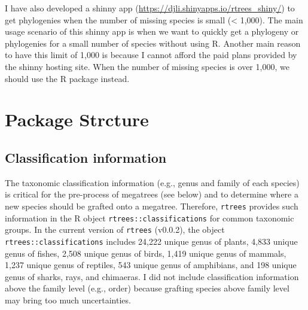 \documentclass[
  12pt,
]{article}
\begin{document}
I have also developed a shinny app (\url{https://djli.shinyapps.io/rtrees_shiny/}) to get phylogenies when the number of missing species is small (\textless{} 1,000). The main usage scenario of this shinny app is when we want to quickly get a phylogeny or phylogenies for a small number of species without using R. Another main reason to have this limit of 1,000 is because I cannot afford the paid plans provided by the shinny hosting site. When the number of missing species is over 1,000, we should use the R package instead.

\hypertarget{package-strcture}{%
\section{Package Strcture}\label{package-strcture}}

\hypertarget{classification-information}{%
\subsection{Classification information}\label{classification-information}}

The taxonomic classification information (e.g., genus and family of each species) is critical for the pre-process of megatrees (see below) and to determine where a new species should be grafted onto a megatree. Therefore, \texttt{rtrees} provides such information in the R object \texttt{rtrees::classifications} for common taxonomic groups. In the current version of \texttt{rtrees} (v0.0.2), the object \texttt{rtrees::classifications} includes 24,222 unique genus of plants, 4,833 unique genus of fishes, 2,508 unique genus of birds, 1,419 unique genus of mammals, 1,237 unique genus of reptiles, 543 unique genus of amphibians, and 198 unique genus of sharks, rays, and chimaeras. I did not include classification information above the family level (e.g., order) because grafting species above family level may bring too much uncertainties.
\end{document}
